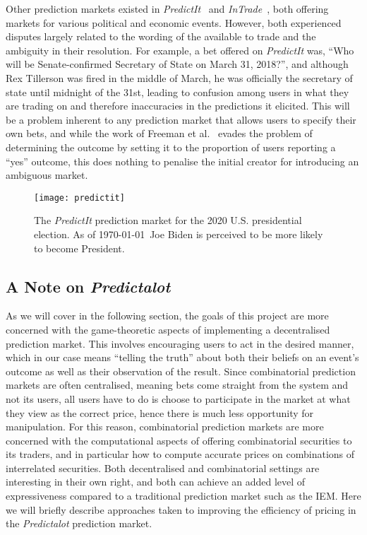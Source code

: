 Other prediction markets existed in \emph{PredictIt}~\cite{PredictIt} and
\emph{InTrade}~\cite{InTrade}, both offering markets for various political and
economic events. However, both experienced disputes largely related to the
wording of the available to trade and the ambiguity in their resolution. For
example, a bet offered on \emph{PredictIt} was, ``Who will be Senate-confirmed
Secretary of State on March 31, 2018?'', and although Rex Tillerson was fired
in the middle of March, he was officially the secretary of state until midnight
of the 31st, leading to confusion among users in what they are trading on and
therefore inaccuracies in the predictions it elicited. This will be a problem
inherent to any prediction market that allows users to specify their own bets,
and while the work of Freeman et al.~\cite{Freeman2017} evades the problem of
determining the outcome by setting it to the proportion of users reporting a
``yes'' outcome, this does nothing to penalise the initial creator for
introducing an ambiguous market.

\begin{figure}[h]
	\centering
	\texttt{[image: predictit]}
	\caption{The \emph{PredictIt} prediction market for the 2020 U.S.
	presidential election. As of \today\ Joe Biden is perceived to be more
	likely to become President.}
	\label{fig:predictit}
\end{figure}

\subsection{A Note on \emph{Predictalot}}

As we will cover in the following section, the goals of this project are more
concerned with the game-theoretic aspects of implementing a decentralised
prediction market. This involves encouraging users to act in the desired
manner, which in our case means ``telling the truth'' about both their beliefs
on an event's outcome as well as their observation of the result. Since
combinatorial prediction markets are often centralised, meaning bets come
straight from the system and not its users, all users have to do is choose to
participate in the market at what they view as the correct price, hence there
is much less opportunity for manipulation. For this reason, combinatorial
prediction markets are more concerned with the computational aspects of
offering combinatorial securities to its traders, and in particular how to
compute accurate prices on combinations of interrelated securities. Both
decentralised and combinatorial settings are interesting in their own right,
and both can achieve an added level of expressiveness compared to a traditional
prediction market such as the IEM. Here we will briefly describe approaches
taken to improving the efficiency of pricing in the \emph{Predictalot}
prediction market.

